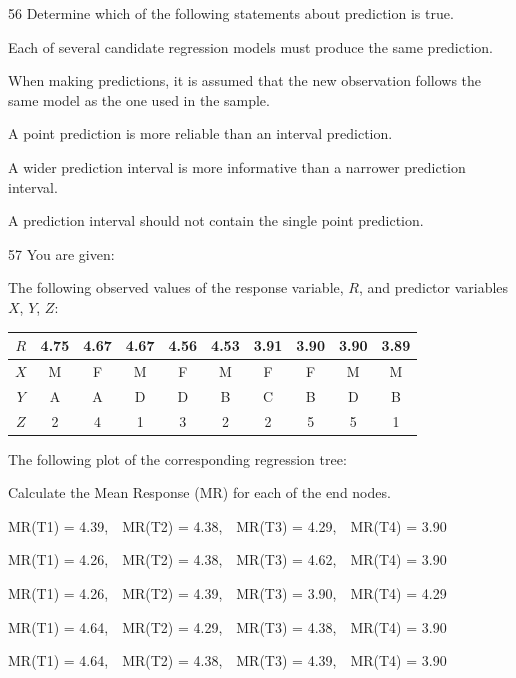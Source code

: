 \begin{question}{56}
Determine which of the following statements about prediction is true.

\begin{choices}
\item Each of several candidate regression models must produce the same prediction.
\item When making predictions, it is assumed that the new observation follows the same model as the one used in the sample.
\item A point prediction is more reliable than an interval prediction.
\item A wider prediction interval is more informative than a narrower prediction interval.
\item A prediction interval should not contain the single point prediction.
\end{choices}
\end{question}
\begin{question}{57}
You are given:
\begin{given}
\item The following observed values of the response variable, $R$, and predictor variables $X$, $Y$, $Z$:
\begin{center}
\begin{tabular}{|c|c|c|c|c|c|c|c|c|c|}
\hline
$R$ & 4.75 & 4.67 & 4.67 & 4.56 & 4.53 & 3.91 & 3.90 & 3.90 & 3.89 \\ \hline
$X$ & M & F & M & F & M & F & F & M & M \\ \hline
$Y$ & A & A & D & D & B & C & B & D & B \\ \hline
$Z$ & 2 & 4 & 1 & 3 & 2 & 2 & 5 & 5 & 1 \\ \hline
\end{tabular}
\end{center}
\item The following plot of the corresponding regression tree:
\end{given}

Calculate the Mean Response (MR) for each of the end nodes.

\begin{choices}
\item MR(T1) = 4.39,\ \ MR(T2) = 4.38,\ \ MR(T3) = 4.29,\ \ MR(T4) = 3.90
\item MR(T1) = 4.26,\ \ MR(T2) = 4.38,\ \ MR(T3) = 4.62,\ \ MR(T4) = 3.90
\item MR(T1) = 4.26,\ \ MR(T2) = 4.39,\ \ MR(T3) = 3.90,\ \ MR(T4) = 4.29
\item MR(T1) = 4.64,\ \ MR(T2) = 4.29,\ \ MR(T3) = 4.38,\ \ MR(T4) = 3.90
\item MR(T1) = 4.64,\ \ MR(T2) = 4.38,\ \ MR(T3) = 4.39,\ \ MR(T4) = 3.90
\end{choices}
\end{question}

